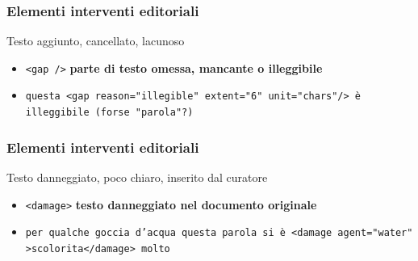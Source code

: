 \begin{frame}
    \frametitle{Elementi interventi editoriali}
    \addtocounter{nframe}{1}
    

    \begin{block}{Testo aggiunto, cancellato, lacunoso}
        \begin{itemize}
            \item \texttt{<gap />} \textbf{parte di testo omessa, mancante o illeggibile}
            \item[] \texttt{questa <gap reason="illegible" extent="6" unit="chars"/> è illeggibile (forse "parola"?)}
        \end{itemize}
        
    \end{block}
    
\end{frame}



\begin{frame}
    \frametitle{Elementi interventi editoriali}
    \addtocounter{nframe}{1}
    

    \begin{block}{Testo danneggiato, poco chiaro, inserito dal curatore}
        \begin{itemize}
            \item \texttt{<damage>} \textbf{testo danneggiato nel documento originale}
            \item[] \texttt{per qualche goccia d’acqua questa parola si è <damage agent="water" >scolorita</damage> molto}
        \end{itemize}
        
    \end{block}
    
\end{frame}

